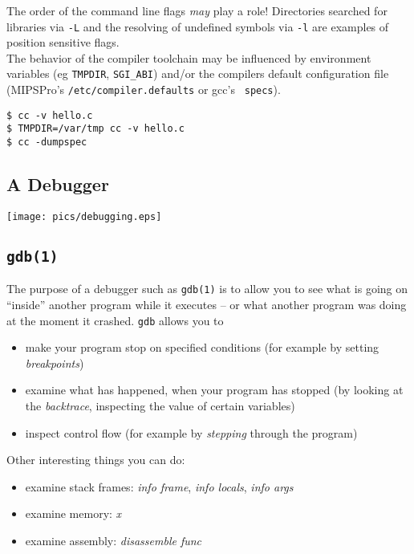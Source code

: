 \documentclass[xga]{xdvislides}
\begin{document}
The order of the command line flags {\em may} play a role!
Directories searched for libraries via {\tt -L} and the resolving of undefined
symbols via {\tt -l} are examples of position sensitive flags.
\\

The behavior of the compiler toolchain may be influenced by environment
variables (eg {\tt TMPDIR}, {\tt SGI\_ABI}) and/or the compilers default
configuration file (MIPSPro's {\tt /etc/compiler.defaults} or gcc's {\tt
specs}).

\begin{verbatim}
$ cc -v hello.c
$ TMPDIR=/var/tmp cc -v hello.c
$ cc -dumpspec
\end{verbatim}

\subsection{A Debugger}
\vspace*{\fill}
\begin{center}
	\texttt{[image: pics/debugging.eps]}
\end{center}
\vspace*{\fill}

\subsection{{\tt gdb(1)}}

The purpose of a debugger such as {\tt gdb(1)} is to allow you to see what is
going on ``inside'' another program while it executes -- or what another
program was doing at the moment it crashed. {\tt gdb} allows you to

\begin{itemize}
	\item make your program stop on specified conditions (for example by
		setting {\em breakpoints})
	\item examine what has happened, when your program has stopped (by looking
		at the {\em backtrace}, inspecting the value of certain variables)
	\item inspect control flow (for example by {\em stepping} through the
		program)
\end{itemize}
\vspace{.25in}
Other interesting things you can do:

\begin{itemize}
	\item examine stack frames: {\em info frame}, {\em info locals}, {\em info
		args}
	\item examine memory: {\em x}
	\item examine assembly: {\em disassemble func}
\end{itemize}
\end{document}
